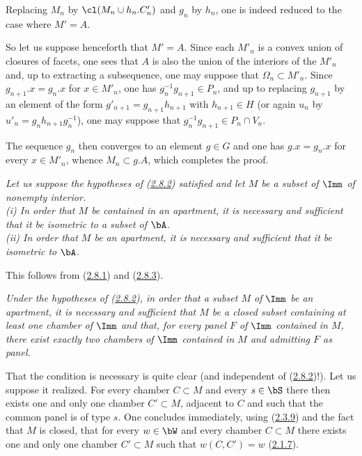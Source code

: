 \documentclass[12pt,a4paper,oneside,english]{smfart}
\makeatletter
\newcommand{\btanchor}[1]{\leavevmode\Hy@raisedlink{\hypertarget{bt:#1}{}}}
\newcommand{\btref}[1]{\hyperlink{bt:#1}{#1}}
\theoremstyle{definition}
\theoremstyle{bt}
\makeatother
\begin{document}
Replacing $M_n$ by $\cl(M_n\cup h_n.C'_n)$ and $g_n$ by $h_n$, one is indeed
reduced to the case where $M'=A$.

So let us suppose henceforth that $M'=A$. Since each $M'_n$ is a convex union
of closures of facets, one sees that $A$ is also the union of the interiors of
the $M'_n$ and, up to extracting a subsequence, one may suppose that
$\Omega_n\subset M'_n$. Since $g_{n+1}.x=g_n.x$ for $x\in M'_n$, one has
$g_n^{-1}g_{n+1}\in P_n$, and up to replacing $g_{n+1}$ by an element of the
form $g'_{n+1}=g_{n+1}h_{n+1}$ with $h_{n+1}\in H$ (or again $u_n$ by
$u'_n=g_nh_{n+1}g_n^{-1}$), one may suppose that
$g_n^{-1}g_{n+1}\in P_n\cap V_n$.

The sequence $g_n$ then converges to an element $g\in G$ and one has
$g.x=g_n.x$ for every $x\in M'_n$, whence $M_n\subset g.A$, which completes
the proof.

\btanchor{2.8.4}
\emph{Let us suppose the hypotheses of (\btref{2.8.2}) satisfied and let $M$ be a
subset of $\Imm$ of nonempty interior.\\
(i) In order that $M$ be contained in an apartment, it is necessary and
sufficient that it be isometric to a subset of $\bA$.\\
(ii) In order that $M$ be an apartment, it is necessary and sufficient that it
be isometric to $\bA$.}

\medskip
This follows from (\btref{2.8.1}) and (\btref{2.8.3}).

\btanchor{2.8.5}
\emph{Under the hypotheses of (\btref{2.8.2}), in order that a subset $M$ of $\Imm$ be
an apartment, it is necessary and sufficient that $M$ be a closed subset
containing at least one chamber of $\Imm$ and that, for every panel $F$ of
$\Imm$ contained in $M$, there exist exactly two chambers of $\Imm$ contained
in $M$ and admitting $F$ as panel.}

\medskip
That the condition is necessary is quite clear (and independent of (\btref{2.8.2})!).
Let us suppose it realized. For every chamber $C\subset M$ and every
$s\in\bS$ there then exists one and only one chamber $C'\subset M$, adjacent
to $C$ and such that the common panel is of type $s$. One concludes
immediately, using (\btref{2.3.9}) and the fact that $M$ is closed, that for every
$w\in\bW$ and every chamber $C\subset M$ there exists one and only one chamber
$C'\subset M$ such that $w(C,C')=w$ (\btref{2.1.7}).
\end{document}
